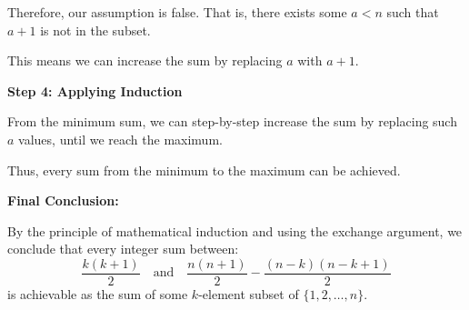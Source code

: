 \documentclass[12pt]{article}
\begin{document}
Therefore, our assumption is false. That is, there exists some $a < n$ such that $a + 1$ is not in the subset.

This means we can increase the sum by replacing $a$ with $a + 1$.

\bigskip

\textbf{Step 4: Applying Induction}

From the minimum sum, we can step-by-step increase the sum by replacing such $a$ values, until we reach the maximum.

Thus, every sum from the minimum to the maximum can be achieved.

\bigskip

\textbf{Final Conclusion:}

By the principle of mathematical induction and using the exchange argument, we conclude that every integer sum between:
$$\frac{k(k+1)}{2} \quad \text{and} \quad \frac{n(n+1)}{2} - \frac{(n-k)(n-k+1)}{2}$$
is achievable as the sum of some $k$-element subset of $\{1, 2, \dots, n\}$.
\end{document}
